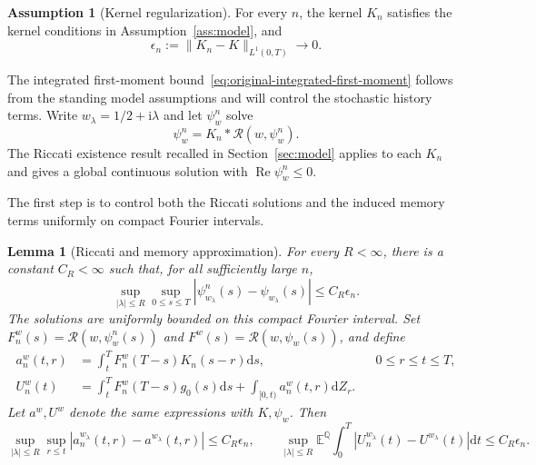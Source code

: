 \documentclass[11pt]{article}
\newtheorem{lemma}[theorem]{Lemma}
\theoremstyle{definition}
\newtheorem{assumption}[theorem]{Assumption}
\theoremstyle{remark}
\newcommand{\E}{\mathbb{E}}
\newcommand{\Q}{\mathbb{Q}}
\newcommand{\Rr}{\mathcal{R}}
\newcommand{\1}{\mathbf{1}}
\newcommand{\dd}{\mathrm{d}}
\begin{document}
\begin{assumption}[Kernel regularization]
\label{ass:original-kernel-regularization}
For every $n$, the kernel $K_n$ satisfies the kernel conditions in
Assumption~\ref{ass:model}, and
\[
 \epsilon_n:=\|K_n-K\|_{L^1(0,T)}\longrightarrow0.
\]
\end{assumption}

The integrated first-moment bound~\eqref{eq:original-integrated-first-moment}
follows from the standing model assumptions and will control the stochastic
history terms. Write
$w_\lambda=1/2+\mathrm{i}\lambda$ and let $\psi_w^n$ solve
\[
 \psi_w^n=K_n*\Rr(w,\psi_w^n).
\]
The Riccati existence result recalled in Section~\ref{sec:model} applies to
each $K_n$ and gives a global continuous solution with
$\operatorname{Re}\psi_w^n\leq0$.

The first step is to control both the Riccati solutions and the induced
memory terms uniformly on compact Fourier intervals.

\begin{lemma}[Riccati and memory approximation]
\label{lem:original-deterministic-stability}
For every $R<\infty$, there is a constant $C_R<\infty$ such that, for all
sufficiently large $n$,
\begin{equation}
\label{eq:original-riccati-stability}
 \sup_{|\lambda|\leq R}\sup_{0\leq s\leq T}
 |\psi_{w_\lambda}^n(s)-\psi_{w_\lambda}(s)|\leq C_R\epsilon_n.
\end{equation}
The solutions are uniformly bounded on this compact Fourier interval.
Set $F_n^w(s)=\Rr(w,\psi_w^n(s))$ and $F^w(s)=\Rr(w,\psi_w(s))$, and define
\begin{align}
 a_n^w(t,r)&=\int_t^T F_n^w(T-s)K_n(s-r)\dd s,
       &&0\leq r\leq t\leq T,\label{eq:original-memory-coefficient}\\
 U_n^w(t)&=\int_t^T F_n^w(T-s)g_0(s)\dd s
       +\int_{[0,t)}a_n^w(t,r)\dd Z_r.
       \label{eq:original-log-memory}
\end{align}
Let $a^w,U^w$ denote the same expressions with $K,\psi_w$. Then
\begin{equation}
\label{eq:original-memory-stability}
 \sup_{|\lambda|\leq R}\sup_{r\leq t}|a_n^{w_\lambda}(t,r)-a^{w_\lambda}(t,r)|
 \leq C_R\epsilon_n,
 \qquad
 \sup_{|\lambda|\leq R}\E^\Q\!\int_0^T
 |U_n^{w_\lambda}(t)-U^{w_\lambda}(t)|\dd t
 \leq C_R\epsilon_n.
\end{equation}
\end{lemma}
\end{document}
